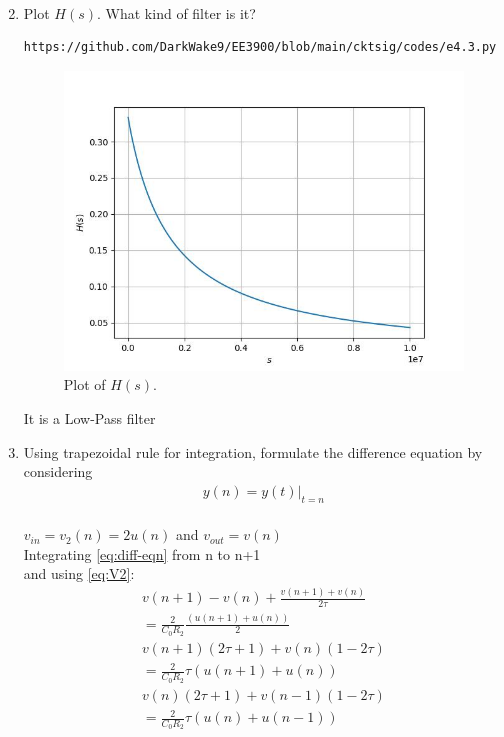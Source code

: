 \documentclass[journal,12pt,twocolumn]{IEEEtran}
\renewcommand\thesection{\arabic{section}}
\begin{document}
\begin{enumerate}[label=\arabic*.,ref=\thesection.\theenumi]
\begin{align}
	\label{eq:Hs}
\end{align}
\item Plot $H(s)$.  What kind of filter is it?\\
\begin{lstlisting}
https://github.com/DarkWake9/EE3900/blob/main/cktsig/codes/e4.3.py
\end{lstlisting}
\begin{figure}[!ht]
	\includegraphics[width=\columnwidth]{./figs/e4.3.jpg}
	\caption{Plot of $H(s)$.}
	\label{fig:Hs}
\end{figure}
\vspace{3.5cm}
It is a Low-Pass filter\\
\item Using trapezoidal rule for integration, formulate the difference equation
by considering 
\begin{align}
	y(n) = y(t)\vert_{t=n}
\end{align}
\solution\\
$v_{in} = v_2(n) = 2u(n)$ and $v_{out} = v(n)$\\
Integrating \eqref{eq:diff-eqn} from n to n+1\\ and using \eqref{eq:V2}:
\begin{align}
	v(n+1) - v(n) + \frac{v(n+1) + v(n)}{2\tau} \nonumber\\ = \frac{2}{C_0R_2}\frac{(u(n+1) + u(n))}{2}\\
	v(n+1)(2\tau + 1) + v(n)(1 - 2\tau) \nonumber \\ = \frac{2}{C_0R_2}\tau(u(n+1) + u(n))\\
	v(n)(2\tau + 1) + v(n-1)(1 - 2\tau) \nonumber \\ = \frac{2}{C_0R_2}\tau(u(n) + u(n-1))

\end{align}
\end{enumerate}
\end{document}
